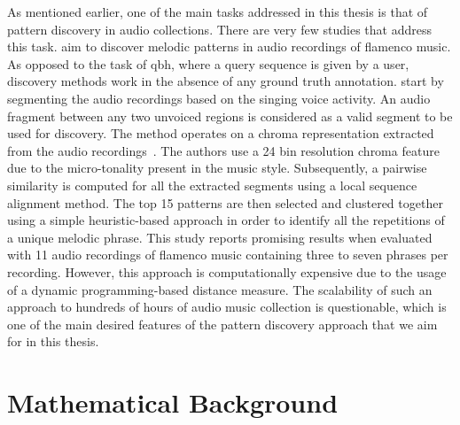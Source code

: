 As mentioned earlier, one of the main tasks addressed in this thesis is that of pattern discovery in audio collections. There are very few studies that address this task. \cite{kroher2015discovery} aim to discover melodic patterns in audio recordings of flamenco music. As opposed to the task of \gls{qbh}, where a query sequence is given by a user, discovery methods work in the absence of any ground truth annotation. \cite{kroher2015discovery} start by segmenting the audio recordings based on the singing voice activity. An audio fragment between any two unvoiced regions is considered as a valid segment to be used for discovery. The method operates on a chroma representation extracted from the audio recordings~\citep{bartsch2005audio}. The authors use a 24 bin resolution chroma feature due to the micro-tonality present in the music style. Subsequently, a pairwise similarity is computed for all the extracted segments using a local sequence alignment method. The top 15 patterns are then selected and clustered together using a simple heuristic-based approach in order to identify all the repetitions of a unique melodic phrase. This study reports promising results when evaluated with 11 audio recordings of flamenco music containing three to seven phrases per recording. However, this approach is computationally expensive due to the usage of a dynamic programming-based distance measure. The scalability of such an approach to hundreds of hours of audio music collection is questionable, which is one of the main desired features of the pattern discovery approach that we aim for in this thesis. 



%
%


%
\section{Mathematical Background}
\label{sec:background_scientific_background}


